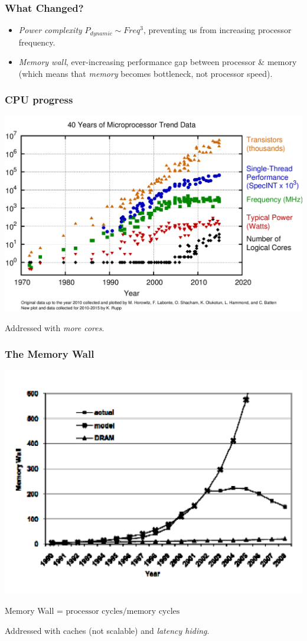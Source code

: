 \documentclass{beamer}
\begin{document}
\begin{frame}
  \frametitle{What Changed?}

  \begin{itemize}
  \item \textit{Power complexity} $P_{dynamic} \sim Freq^3$,
    preventing us from increasing processor frequency.
  \item \textit{Memory wall}, ever-increasing performance gap between
    processor \& memory (which means that \textit{memory} becomes
    bottleneck, not processor speed).
  \end {itemize}
\end{frame}

\begin{frame}
  \frametitle{CPU progress}

  \includegraphics[width=\textwidth]{img/40-years-processor-trend.png}

Addressed with \textit{more cores}.

\end{frame}

\begin{frame}
  \frametitle{The Memory Wall}

\begin{center}
\includegraphics[width=50ex]{img/memwall}

  Memory Wall = $\text{processor cycles} / \text{memory cycles}$
\end{center}

Addressed with caches (not scalable) and \textit{latency hiding}.

\end{frame}
\end{document}
